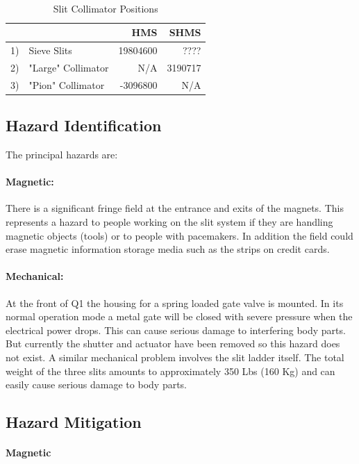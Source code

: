 {\begin{table}[!ht]\
\caption{Slit Collimator Positions\label{tab:col_pos}}
\begin{center}
\begin{tabular}{rlrr}
   &                  &     HMS   & SHMS\\
\hline
1) & Sieve Slits      &  19804600 &  ????\\
2) & "Large" Collimator &       N/A &   3190717\\
3) & "Pion" Collimator  &  -3096800 &       N/A\\
\end{tabular}
\end{center}
\end{table}

   
\subsection{Hazard Identification}

The principal hazards are:
\paragraph{Magnetic:} There is a significant fringe field at
the entrance and exits of the magnets. This represents a hazard
to people working on the slit system if they are handling magnetic
objects (tools) or to people with pacemakers. In addition the field could erase magnetic
information storage media such as the strips on credit cards.
\paragraph{Mechanical:} At the front of Q1 the housing for a spring loaded gate valve is
mounted. In its normal operation mode a metal gate will be closed with
severe pressure when the electrical power drops. This can cause serious
damage to interfering body parts.  But currently the shutter and
actuator have been removed so this hazard does not exist.  
A similar mechanical problem involves the slit ladder itself. The total weight of
the three slits amounts to approximately 350 Lbs (160 Kg) and can easily
cause serious damage to body parts.

\subsection{Hazard Mitigation}

\paragraph{Magnetic}

}
